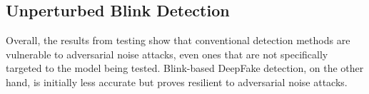 
\subsection{Unperturbed Blink Detection}

Overall, the results from testing show that conventional detection methods are vulnerable to adversarial noise attacks, even ones that are not specifically targeted to the model being tested. Blink-based DeepFake detection, on the other hand, is initially less accurate but proves resilient to adversarial noise attacks.

